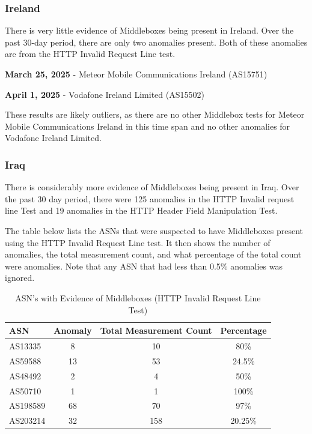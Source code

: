\subsubsection{Ireland}

There is very little evidence of Middleboxes being present in Ireland. Over the past 30-day period, there are only two anomalies present. Both of these anomalies are from the HTTP Invalid Request Line test. 

\textbf{March 25, 2025} - Meteor Mobile Communications Ireland (AS15751)

\textbf{April 1, 2025} - Vodafone Ireland Limited (AS15502)

These results are likely outliers, as there are no other Middlebox tests for Meteor Mobile Communications Ireland in this time span and no other anomalies for Vodafone Ireland Limited.

\subsubsection{Iraq}

There is considerably more evidence of Middleboxes being present in Iraq. Over the past 30 day period, there were 125 anomalies in the HTTP Invalid request line Test and 19 anomalies in the HTTP Header Field Manipulation Test.

The table below lists the ASNs that were suspected to have Middleboxes present using the HTTP Invalid Request Line test. It then shows the number of anomalies, the total measurement count, and what percentage of the total count were anomalies. Note that any ASN that had less than 0.5\% anomalies was ignored.

\begin{table}[H]
\centering
\caption{ASN's with Evidence of Middleboxes (HTTP Invalid Request Line Test)}
\begin{tabular}{lccc}
\toprule
\textbf{ASN} & \textbf{Anomaly} & \textbf{Total Measurement Count} & \textbf{Percentage} \\
\midrule
AS13335   & 8 & 10 & 80\% \\
AS59588   & 13 & 53 & 24.5\% \\
AS48492   & 2 & 4 & 50\% \\
AS50710   & 1 & 1 & 100\% \\
AS198589  & 68 & 70 & 97\% \\
AS203214  & 32 & 158 & 20.25\% \\
\bottomrule
\end{tabular}
\label{tab:category_block}
\end{table}

